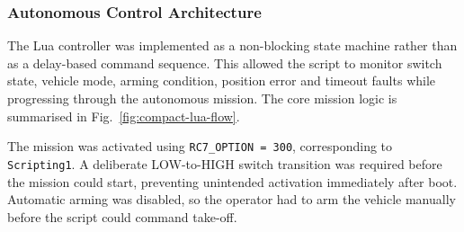 \documentclass[conference]{IEEEtran}
\begin{document}

\subsubsection*{Autonomous Control Architecture}

The Lua controller was implemented as a non-blocking state machine rather than
as a delay-based command sequence. This allowed the script to monitor switch
state, vehicle mode, arming condition, position error and timeout faults while
progressing through the autonomous mission. The core mission logic is summarised
in Fig.~\ref{fig:compact-lua-flow}.

The mission was activated using \texttt{RC7\_OPTION = 300}, corresponding to
\texttt{Scripting1}. A deliberate LOW-to-HIGH switch transition was required
before the mission could start, preventing unintended activation immediately
after boot. Automatic arming was disabled, so the operator had to arm the
vehicle manually before the script could command take-off.
\end{document}
